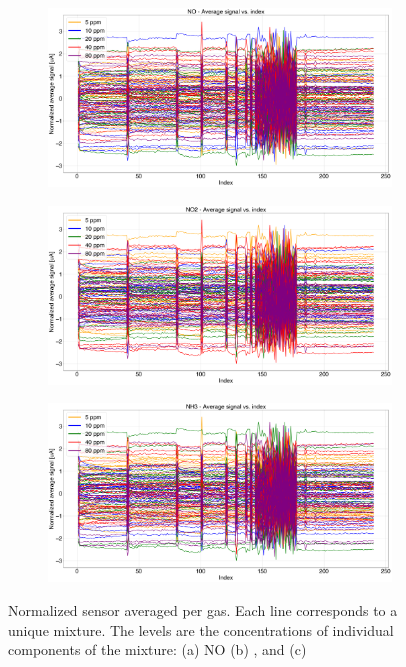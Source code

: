 \begin{figure}[!htb]
	\centering
	
	\begin{subfigure}[t]{0.9\textwidth}
		\includegraphics[width=1\linewidth]{../figures/order2NO.png}
		\caption{}
		\label{fig:order2NO} 
	\end{subfigure}
	
	\begin{subfigure}[t]{0.9\textwidth}
		\includegraphics[width=1\linewidth]{../figures/order2NO2.png}
		\caption{}
		\label{fig:order2NO2}
	\end{subfigure}

	\begin{subfigure}[t]{0.9\textwidth}
		\includegraphics[width=1\linewidth]{../figures/order2NH3.png}
		\caption{}
		\label{fig:order2NH3}
	\end{subfigure}
	
	\caption{Normalized sensor averaged per gas. Each line corresponds to a unique mixture. The levels are the concentrations of individual components of the mixture: (a) NO (b) , and (c) }
	\label{fig:order2-both}
\end{figure}




